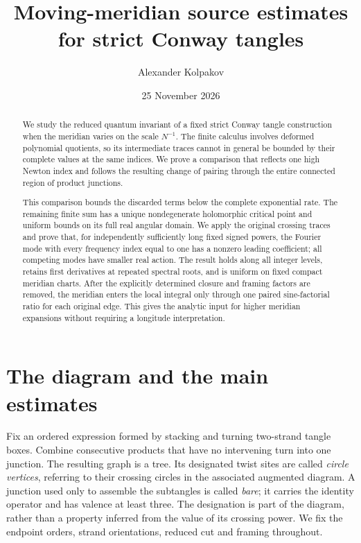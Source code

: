 \documentclass[11pt]{article}
\title{Moving-meridian source estimates for strict Conway tangles}
\author{Alexander Kolpakov}\date{25 November 2026}
\numberwithin{equation}{section}
\theoremstyle{definition}\newtheorem{definition}[theorem]{Definition}
\begin{document}
\maketitle
\begin{abstract}
We study the reduced quantum invariant of a fixed strict Conway
tangle construction when the meridian varies on the scale $N^{-1}$.
The finite calculus involves deformed polynomial quotients, so its
intermediate traces cannot in general be bounded by their complete
values at the same indices. We prove a comparison that reflects one
high Newton index and follows the resulting change of pairing through
the entire connected region of product junctions.

This comparison bounds the discarded terms below the complete
exponential rate. The remaining finite sum has a unique nondegenerate
holomorphic critical point and uniform bounds on its full real angular
domain. We apply the original crossing traces and prove that, for
independently sufficiently long fixed signed powers, the Fourier mode
with every frequency index equal to one has a nonzero leading
coefficient; all competing modes have smaller real action. The result
holds along all integer levels, retains first derivatives at repeated
spectral roots, and is uniform on fixed compact meridian charts. After
the explicitly determined closure and framing factors are removed,
the meridian enters the local integral only through one paired
sine-factorial ratio for each original edge. This gives the analytic
input for higher meridian expansions without requiring a longitude
interpretation.
\end{abstract}

\section{The diagram and the main estimates}\label{ms:intro}
Fix an ordered expression formed by stacking and turning two-strand
tangle boxes. Combine consecutive products that have no intervening
turn into one junction. The resulting graph is a tree. Its designated
twist sites are called \emph{circle vertices}, referring to their
crossing circles in the associated augmented diagram. A junction used
only to assemble the subtangles is called \emph{bare}; it carries the
identity operator and has valence at least three. The designation is
part of the diagram, rather than a property inferred from the value
of its crossing power. We fix the endpoint orders, strand orientations,
reduced cut and framing throughout.
\end{document}
